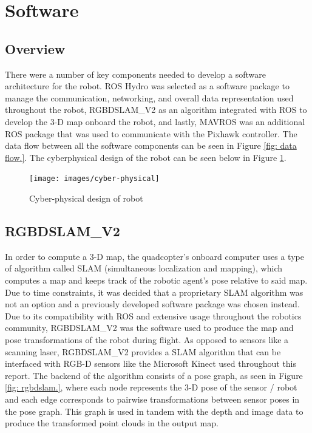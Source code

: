 \documentclass[letterpaper, oneside, 10pt]{report}
\begin{document}
\section{Software}

\subsection{Overview}
There were a number of key components needed to develop a software architecture for the robot. ROS Hydro was selected as a software package to manage the communication, networking, and overall data representation used throughout the robot, RGBDSLAM\_V2 as an algorithm integrated with ROS to develop the 3-D map onboard the robot, and lastly, MAVROS was an additional ROS package that was used to communicate with the Pixhawk controller. The data flow between all the software components can be seen in Figure \ref{fig: data flow.}. The cyberphysical design of the robot can be seen below in Figure \ref{fig: cyber-physical.}. \\

\begin{figure}[h!]
 \caption{Cyber-physical design of robot}
 \centering
   \texttt{[image: images/cyber-physical]}
 \label{fig: cyber-physical.}
\end{figure}

\subsection{RGBDSLAM\_V2}
\noindent In order to compute a 3-D map, the quadcopter's onboard computer uses a type of algorithm called SLAM (simultaneous localization and mapping), which computes a map and keeps track of the robotic agent's pose relative to said map. Due to time constraints, it was decided that a proprietary SLAM algorithm was not an option and a previously developed software package was chosen instead. Due to its compatibility with ROS and extensive usage throughout the robotics community, RGBDSLAM\_V2 \cite{endres2012evaluation} was the software used to produce the map and pose transformations of the robot during flight. As opposed to sensors like a scanning laser, RGBDSLAM\_V2 provides a SLAM algorithm that can be interfaced with RGB-D sensors like the Microsoft Kinect used throughout this report. The backend of the algorithm consists of a pose graph, as seen in Figure \ref{fig: rgbdslam.}, where each node represents the 3-D pose of the sensor / robot and each edge corresponds to pairwise transformations between sensor poses in the pose graph. This graph is used in tandem with the depth and image data to produce the transformed point clouds in the output map.
\end{document}
